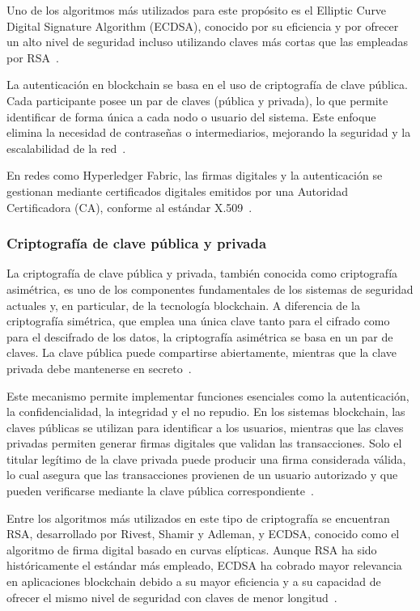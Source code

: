 Uno de los algoritmos más utilizados para este propósito es el Elliptic Curve Digital Signature Algorithm (ECDSA), conocido por su eficiencia y por ofrecer un alto nivel de seguridad incluso utilizando claves más cortas que las empleadas por RSA~\cite{Koblitz2004}.

La autenticación en blockchain se basa en el uso de criptografía de clave pública. Cada participante posee un par de claves (pública y privada), lo que permite identificar de forma única a cada nodo o usuario del sistema. Este enfoque elimina la necesidad de contraseñas o intermediarios, mejorando la seguridad y la escalabilidad de la red~\cite{Bishop2019}.

En redes como Hyperledger Fabric, las firmas digitales y la autenticación se gestionan mediante certificados digitales emitidos por una Autoridad Certificadora (CA), conforme al estándar X.509~\cite{HyperledgerFabric2.5Identity}.

\subsubsection{Criptografía de clave pública y privada}
La criptografía de clave pública y privada, también conocida como criptografía asimétrica, es uno de los componentes fundamentales de los sistemas de seguridad actuales y, en particular, de la tecnología blockchain. A diferencia de la criptografía simétrica, que emplea una única clave tanto para el cifrado como para el descifrado de los datos, la criptografía asimétrica se basa en un par de claves. La clave pública puede compartirse abiertamente, mientras que la clave privada debe mantenerse en secreto~\cite{Stallings2017}.

Este mecanismo permite implementar funciones esenciales como la autenticación, la confidencialidad, la integridad y el no repudio. En los sistemas blockchain, las claves públicas se utilizan para identificar a los usuarios, mientras que las claves privadas permiten generar firmas digitales que validan las transacciones. Solo el titular legítimo de la clave privada puede producir una firma considerada válida, lo cual asegura que las transacciones provienen de un usuario autorizado y que pueden verificarse mediante la clave pública correspondiente~\cite{Bishop2019}.

Entre los algoritmos más utilizados en este tipo de criptografía se encuentran RSA, desarrollado por Rivest, Shamir y Adleman, y ECDSA, conocido como el algoritmo de firma digital basado en curvas elípticas. Aunque RSA ha sido históricamente el estándar más empleado, ECDSA ha cobrado mayor relevancia en aplicaciones blockchain debido a su mayor eficiencia y a su capacidad de ofrecer el mismo nivel de seguridad con claves de menor longitud~\cite{Koblitz2004}.

